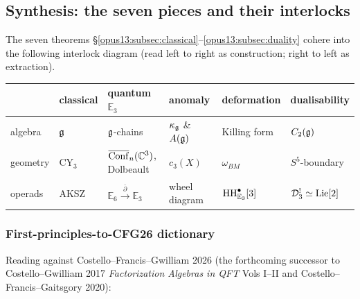 \subsection{Synthesis: the seven pieces and their interlocks}
\label{opus13:subsec:synthesis}

The seven theorems \S\ref{opus13:subsec:classical}--\ref{opus13:subsec:duality}
cohere into the following interlock diagram (read left to right as
construction; right to left as extraction).

\begin{center}
\begin{tabular}{@{}llllll@{}}
 & classical & quantum $\mathbb E_3$ & anomaly & deformation & dualisability \\
\hline
algebra & $\mathfrak{g}$ & $\mathfrak{g}$-chains & $\kappa_{\mathfrak{g}}$ \& $A(\mathfrak{g})$ & Killing form & $C_2(\mathfrak{g})$ \\
geometry & CY$_3$ & $\overline{\mathrm{Conf}}_n(\mathbb{C}^3)$, Dolbeault & $c_3(X)$ & $\omega_{BM}$ & $S^5$-boundary \\
operads & AKSZ & $\mathbb E_6\xrightarrow{\bar\partial}\mathbb E_3$ & wheel diagram & $\mathrm{HH}^\bullet_{\mathbb E_3}[3]$ & $\mathcal{D}_3^!\simeq\mathrm{Lie}[2]$
\end{tabular}
\end{center}

\subsubsection{First-principles-to-CFG26 dictionary}

Reading against Costello--Francis--Gwilliam 2026 (the forthcoming
successor to Costello--Gwilliam 2017 \emph{Factorization Algebras in
QFT} Vols I--II and Costello--Francis--Gaitsgory 2020):

